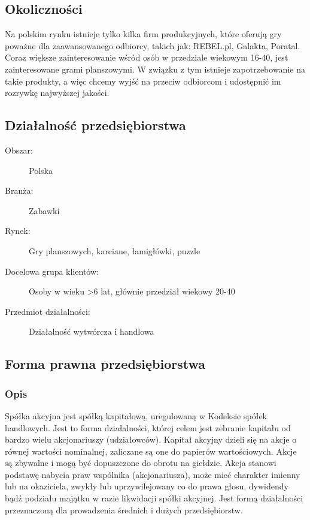 \documentclass[a4paper, 11pt]{article}
\begin{document}
	\subsection{Okoliczności} 
	\indent
		
	Na polskim rynku istnieje tylko kilka firm produkcyjnych, które oferują gry poważne dla zaawansowanego odbiorcy, takich jak: REBEL.pl, Galakta, Poratal. Coraz większe zainteresowanie wśród osób w przedziale wiekowym 16-40, jest zainteresowane grami planszowymi. W związku z tym istnieje zapotrzebowanie na takie produkty, a więc chcemy wyjść na przeciw odbiorcom i udostępnić im rozrywkę najwyższej jakości.


	
	\subsection{Działalność przedsiębiorstwa}
	
	\begin{description}
	\item[Obszar:]	Polska
	\item[Branża:]	Zabawki
	\item[Rynek:]	Gry planszowych, karciane, łamigłówki, puzzle
	\item[Docelowa grupa klientów:]	Osoby w wieku >6 lat, głównie przedział wiekowy 20-40
	\item[Przedmiot działalności:]	Działalność wytwórcza i handlowa		
	\end{description}


	\subsection{Forma prawna przedsiębiorstwa}

	\subsubsection{Opis}
	\indent	

	Spółka akcyjna jest spółką kapitałową, uregulowaną w Kodeksie spółek handlowych. Jest to forma działalności, której celem jest zebranie kapitału od bardzo wielu akcjonariuszy (udziałowców).  Kapitał akcyjny dzieli się na akcje o równej wartości nominalnej, zaliczane są one do papierów wartościowych. Akcje są zbywalne i mogą być dopuszczone do obrotu na giełdzie. Akcja stanowi podstawę nabycia praw wspólnika (akcjonariusza), może mieć charakter imienny lub na okaziciela, zwykły lub uprzywilejowany co do prawa głosu, dywidendy bądź podziału majątku w razie likwidacji spółki akcyjnej. Jest formą działalności przeznaczoną dla prowadzenia średnich i dużych przedsiębiorstw. 
\end{document}
